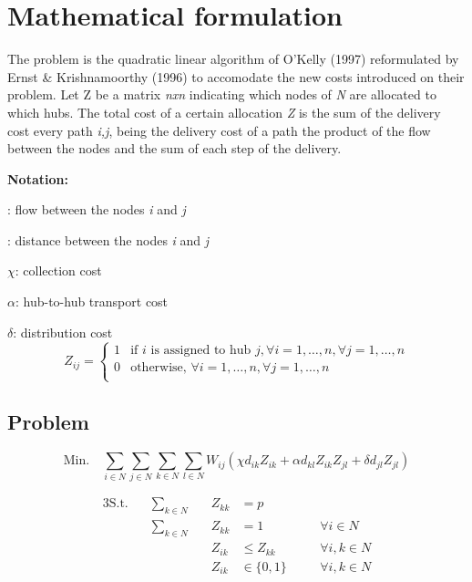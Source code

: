 \section{Mathematical formulation}

The problem  is the quadratic linear algorithm of O'Kelly (1997)\cite{OKelly1987}
reformulated by Ernst \& Krishnamoorthy (1996)\cite{Ernst1996} to accomodate the new costs
introduced on their problem. Let Z be a matrix \emph{nxn} indicating which nodes of \emph{N} are
allocated to which hubs. The total cost of a certain allocation \emph{Z} is the sum of the
delivery cost every path \emph{i,j}, being the delivery cost of a path the product of the
flow between the nodes and the sum of each step of the delivery.

\break

\textbf{Notation:}

\wij: flow between the nodes \emph{i} and \emph{j}

: distance between the nodes \emph{i} and \emph{j} 

$\chi$: collection cost

$\alpha$: hub-to-hub transport cost

$\delta$: distribution cost
\[
Z_{ij} = \begin{cases}
  1 & \text{if } i \text{ is assigned to hub } j, \forall i = 1,\dots,n, \forall j = 1,\dots,n \\
  0 & \text{otherwise, }\forall i = 1,\dots,n, \forall j = 1,\dots,n \\
\end{cases}
\]

\subsection{Problem }

\[
  \text{Min.} \quad \sum_{i\in N}\sum_{j\in N}\sum_{k\in N}\sum_{l\in N} W_{ij}(\chi d_{ik} Z_{ik} + \alpha d_{kl} Z_{ik} Z_{jl} + \delta d_{jl} Z_{jl})
\]

\begin{alignat}{3}
  \text{S.t.} \quad & \sum_{k \in N} & \quad Z_{kk} &= p         & \label{p_hubs}\\
                    & \sum_{k \in N} & \quad Z_{kk} &= 1         & \quad & \forall i \in N \label{single_alloc} \\
                    &                & \quad Z_{ik} &\le Z_{kk}  & \quad & \forall i, k \in N \label{only_hubs} \\
                    &                & \quad Z_{ik} &\in \{0,1\} & \quad & \forall i, k \in N \label{prev_realloc}
\end{alignat}

